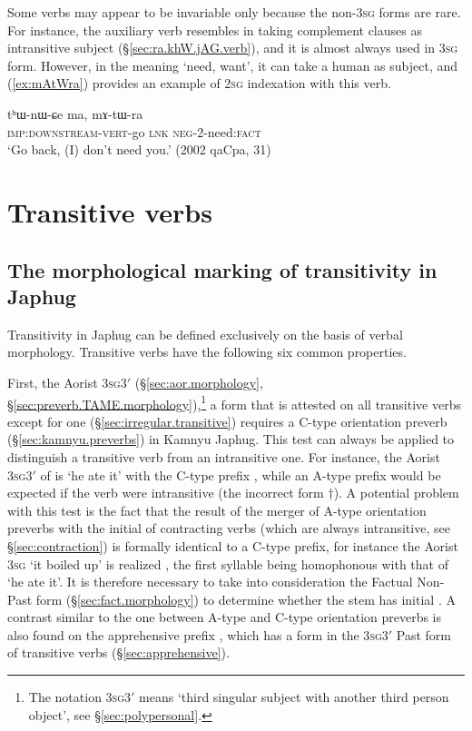 Some verbs may appear to be invariable only because the non-\textsc{3sg} forms are rare. For instance, the auxiliary verb  resembles  in taking complement clauses as intransitive subject (§\ref{sec:ra.khW.jAG.verb}), and it is almost always used in \textsc{3sg} form. However, in the meaning `need, want', it can take a human as subject, and (\ref{ex:mAtWra}) provides an example of \textsc{2sg} indexation with this verb.

\begin{exe}
\ex   \label{ex:mAtWra}
\gll  tʰɯ-nɯ-ɕe ma, mɤ-tɯ-ra \\
\textsc{imp}:\textsc{downstream}-\textsc{vert}-go \textsc{lnk} \textsc{neg}-2-need:\textsc{fact} \\
\glt `Go back, (I) don't need you.' (2002 qaCpa, 31)
\end{exe}

\section{Transitive verbs} \label{sec:tr.indexation}

\subsection{The morphological marking of transitivity in Japhug} \label{sec:transitivity.morphology}
Transitivity in Japhug can be defined exclusively on the basis of verbal morphology. Transitive verbs have the following six common properties.

First, the Aorist 3\textsc{sg}\fl{}3$'$ (§\ref{sec:aor.morphology}, §\ref{sec:preverb.TAME.morphology}),\footnote{The notation 3\textsc{sg}\fl{}3$'$ means `third singular subject with another third person object', see §\ref{sec:polypersonal}. } a form that is attested on all transitive verbs except for one (§\ref{sec:irregular.transitive}) requires a C-type orientation preverb (§\ref{sec:kamnyu.preverbs}) in Kamnyu Japhug. This test can always be applied to distinguish a transitive verb from an intransitive one. For instance, the Aorist 3\textsc{sg}\fl{}3$'$ of  is  `he ate it' with the C-type prefix , while an A-type prefix  would be expected if the verb were intransitive (the incorrect form $\dagger$). A potential problem with this test is the fact that the result of the merger of A-type orientation preverbs with the initial  of contracting verbs (which are always intransitive, see §\ref{sec:contraction}) is formally identical to a C-type prefix, for instance the Aorist \textsc{3sg}  `it boiled up' is realized , the first syllable  being homophonous with that of  `he ate it'. It is therefore necessary to take into consideration the Factual Non-Past form (§\ref{sec:fact.morphology}) to determine whether the stem has initial . A contrast similar to the one between A-type and C-type orientation preverbs is also found on the apprehensive prefix , which has a form  in the 3\textsc{sg}\fl{}3$'$ Past form of transitive verbs (§\ref{sec:apprehensive}).

